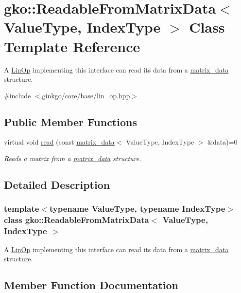 \hypertarget{classgko_1_1ReadableFromMatrixData}{}\section{gko\+:\+:Readable\+From\+Matrix\+Data$<$ Value\+Type, Index\+Type $>$ Class Template Reference}
\label{classgko_1_1ReadableFromMatrixData}


A \hyperlink{classgko_1_1LinOp}{Lin\+Op} implementing this interface can read its data from a \hyperlink{structgko_1_1matrix__data}{matrix\+\_\+data} structure.  




{\ttfamily \#include $<$ginkgo/core/base/lin\+\_\+op.\+hpp$>$}

\subsection*{Public Member Functions}
\begin{DoxyCompactItemize}
\item 
virtual void \hyperlink{classgko_1_1ReadableFromMatrixData_add5c12e23b3ac3c8fbd607fa5a9656bb}{read} (const \hyperlink{structgko_1_1matrix__data}{matrix\+\_\+data}$<$ Value\+Type, Index\+Type $>$ \&data)=0
\begin{DoxyCompactList}\small\item\em Reads a matrix from a \hyperlink{structgko_1_1matrix__data}{matrix\+\_\+data} structure. \end{DoxyCompactList}\end{DoxyCompactItemize}


\subsection{Detailed Description}
\subsubsection*{template$<$typename Value\+Type, typename Index\+Type$>$\newline
class gko\+::\+Readable\+From\+Matrix\+Data$<$ Value\+Type, Index\+Type $>$}

A \hyperlink{classgko_1_1LinOp}{Lin\+Op} implementing this interface can read its data from a \hyperlink{structgko_1_1matrix__data}{matrix\+\_\+data} structure. 

\subsection{Member Function Documentation}
\mbox{\label{classgko_1_1ReadableFromMatrixData_add5c12e23b3ac3c8fbd607fa5a9656bb}} 
